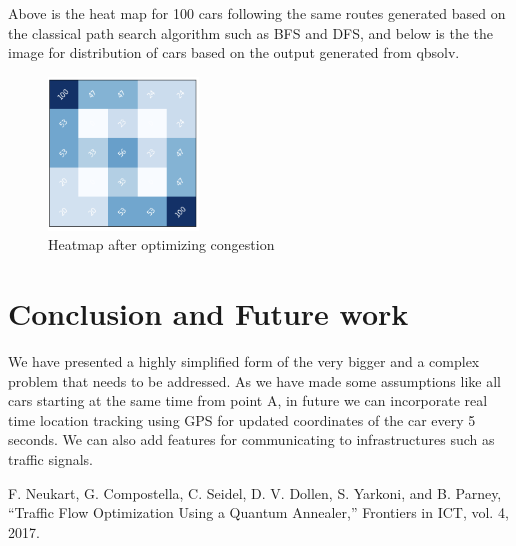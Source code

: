 \documentclass[conference]{IEEEtran}
\begin{document}
Above is the heat map for 100 cars following the same routes generated based on the classical path search algorithm such as BFS and DFS, and below is the the image for distribution of cars based on the output generated from qbsolv.

\begin{figure}[H]
\centerline{\includegraphics[width=4cm,angle=-45,origin=c]{heatmap2.png}}
\caption{Heatmap after optimizing congestion}
\label{fig}
\end{figure}

\section{Conclusion and Future work}

We have presented a highly simplified form of the very bigger and a complex problem that needs to be addressed. As we have made some assumptions like all cars starting at the same time from point A, in future we can incorporate real time location tracking using GPS for updated coordinates of the car every 5 seconds. We can also add features for communicating to infrastructures such as traffic signals.

\begin{thebibliography}{00}
 F. Neukart, G. Compostella, C. Seidel, D. V. Dollen, S. Yarkoni, and B. Parney, “Traffic Flow Optimization Using a Quantum Annealer,” Frontiers in ICT, vol. 4, 2017.

\end{thebibliography}
\vspace{12pt}
\end{document}

